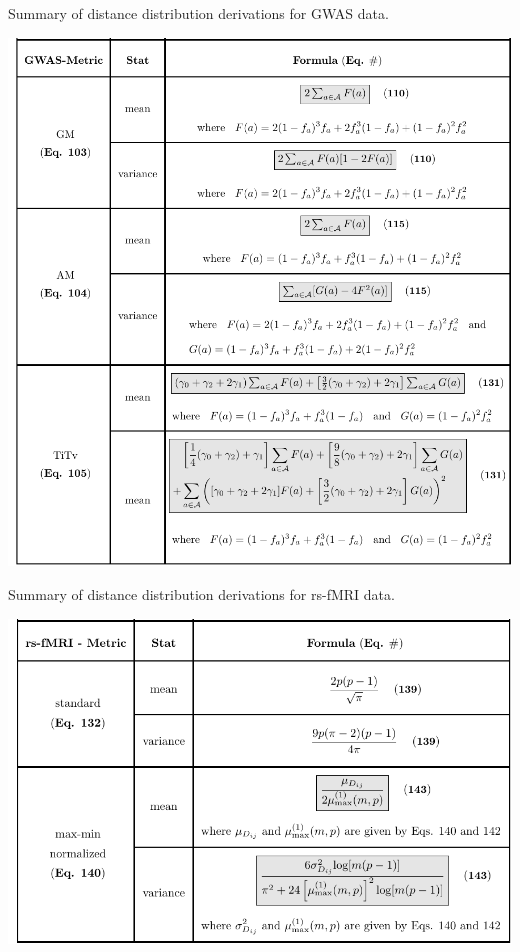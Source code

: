 \documentclass[10pt,letterpaper]{article}\usepackage[]{graphicx}\usepackage[]{color}
\begin{document}
\begin{table}[H]
\caption{Summary of distance distribution derivations for GWAS data.}
\label{tab:dist_distr_gwas}
\centering
\includegraphics[clip,trim=0.27cm 0.0cm 0.0cm 0.05cm,width=\textwidth]{updated_distributions_table-gwas(5-23-2019).pdf}
\end{table}

\begin{table}[H]
\caption{Summary of distance distribution derivations for rs-fMRI data.}
\label{tab:dist_distr_rs-fMRI}
\centering
\includegraphics[clip,trim=0.27cm 0.0cm 0.0cm 0.05cm,width=\textwidth]{updated_distributions_table-rs-fMRI.pdf}
\end{table}


\end{document}
